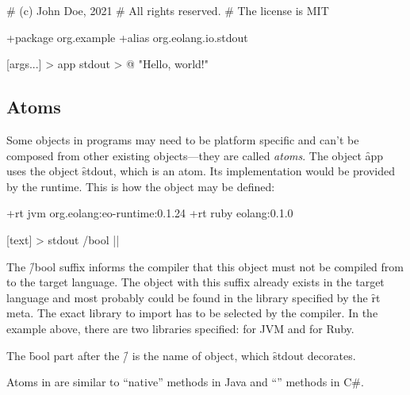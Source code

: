 \begin{eocode}
# (c) John Doe, 2021
# All rights reserved.
# The license is MIT

+package org.example
+alias org.eolang.io.stdout

[args...] > app
  stdout > @
    "Hello, world!\n"
\end{eocode}

\subsection{Atoms}

Some objects in \eo{} programs may need to be platform specific
and can't be composed from other existing objects---they are called
\emph{atoms}.
The object \f{app} uses the object \f{stdout},
which is an atom. Its implementation would be provided by the
runtime. This is how the object may be defined:

\begin{eocode}
+rt jvm org.eolang:eo-runtime:0.1.24
+rt ruby eolang:0.1.0

[text] > stdout /bool |$\label{ln:stdout}$|
\end{eocode}

The \f{/bool} suffix informs the compiler that this object must
not be compiled from \eo{} to the target language. The object
with this suffix already exists in the target language and most
probably could be found in the library specified by the \f{rt}
meta. The exact library to import has to be selected by the compiler.
In the example above, there are two libraries specified: for JVM and
for Ruby.

The \f{bool} part after the \f{/} is the name of
object, which \f{stdout} decorates.

Atoms in \eo{} are similar to ``native'' methods in Java and ``'' methods
in C\#.







